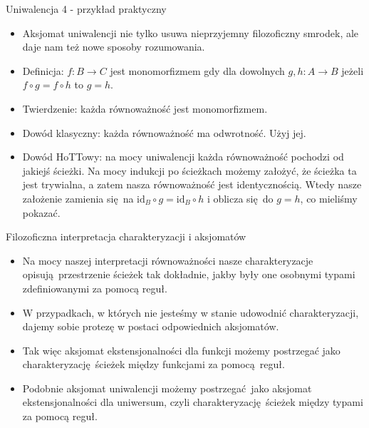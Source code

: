 \documentclass{beamer}
\newcommand{\id}{\text{id}}
\newcommand{\comp}{\circ}
\begin{document}
\begin{frame}{Uniwalencja 4 - przykład praktyczny}
\begin{itemize}
	\item Aksjomat uniwalencji nie tylko usuwa nieprzyjemny filozoficzny smrodek, ale daje nam też nowe sposoby rozumowania.
	\item Definicja: $f : B \to C$ jest monomorfizmem gdy dla dowolnych $g, h : A \to B$ jeżeli $f \comp g = f \comp h$ to $g = h$.
	\item Twierdzenie: każda równoważność jest monomorfizmem.
	\item Dowód klasyczny: każda równoważność ma odwrotność. Użyj jej.
	\item Dowód HoTTowy: na mocy uniwalencji każda równoważność pochodzi od jakiejś ścieżki. Na mocy indukcji po ścieżkach możemy założyć, że ścieżka ta jest trywialna, a zatem nasza równoważność jest identycznością. Wtedy nasze założenie zamienia się na $\id_B \comp g = \id_B \comp h$ i oblicza się do $g = h$, co mieliśmy pokazać.
\end{itemize}
\end{frame}

\begin{frame}{Filozoficzna interpretacja charakteryzacji i aksjomatów}
\begin{itemize}
	\item Na mocy naszej interpretacji równoważności nasze charakteryzacje opisują przestrzenie ścieżek tak dokładnie, jakby były one osobnymi typami zdefiniowanymi za pomocą reguł.
	\item W przypadkach, w których nie jesteśmy w stanie udowodnić charakteryzacji, dajemy sobie protezę w postaci odpowiednich aksjomatów.
	\item Tak więc aksjomat ekstensjonalności dla funkcji możemy postrzegać jako charakteryzację ścieżek między funkcjami za pomocą reguł.
	\item Podobnie aksjomat uniwalencji możemy postrzegać jako aksjomat ekstensjonalności dla uniwersum, czyli charakteryzację ścieżek między typami za pomocą reguł.
\end{itemize}
\end{frame}
\end{document}
